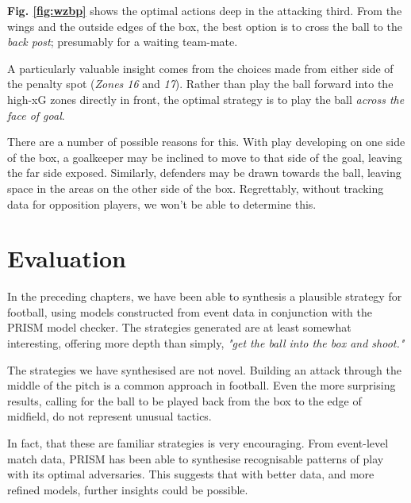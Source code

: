 \documentclass{l4proj}
\begin{document}
\textbf{Fig. \ref{fig:wzbp}} shows the optimal actions deep in the attacking third. From the wings and the outside edges of the box, the best option is to cross the ball to the \textit{back post}; presumably for a waiting team-mate. 

A particularly valuable insight comes from the choices made from either side of the penalty spot (\textit{Zones 16} and \textit{17}). Rather than play the ball forward into the high-xG zones directly in front, the optimal strategy is to play the ball \textit{across the face of goal}.

There are a number of possible reasons for this. With play developing on one side of the box, a goalkeeper may be inclined to move to that side of the goal, leaving the far side exposed. Similarly, defenders may be drawn towards the ball, leaving space in the areas on the other side of the box. Regrettably, without tracking data for opposition players, we won't be able to determine this.


\chapter{Evaluation} 

In the preceding chapters, we have been able to synthesis a plausible strategy for football, using models constructed from event data in conjunction with the PRISM model checker. The strategies generated are at least somewhat interesting, offering more depth than simply, \textit{"get the ball into the box and shoot."}

The strategies we have synthesised are not novel. Building an attack through the middle of the pitch is a common approach in football. Even the more surprising results, calling for the ball to be played back from the box to the edge of midfield, do not represent unusual tactics.

In fact, that these are familiar strategies is very encouraging. From event-level match data, PRISM has been able to synthesise recognisable patterns of play with its optimal adversaries. This suggests that with better data, and more refined models, further insights could be possible.
\end{document}
